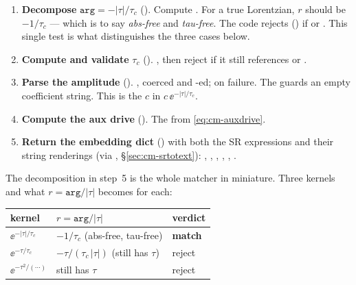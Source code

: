 \begin{enumerate}
  \item \textbf{Decompose} $\mathtt{arg} = -|\tau|/\tau_c$
        (). Compute
        . For a true Lorentzian, $r$
        should be $-1/\tau_c$ --- which is to say \emph{abs-free} and
        \emph{tau-free}. The code rejects () if
         or . This single test is what
        distinguishes the three cases below.

  \item \textbf{Compute and validate} $\tau_c$
        ().
        , then reject if it still
        references  or .

  \item \textbf{Parse the amplitude}
        ().
        , coerced
        and -ed;  on failure. The
         guards an empty coefficient string. This is the $c$ in
        $c\,\ee^{-|\tau|/\tau_c}$.

  \item \textbf{Compute the aux drive}
        (). The
        from \eqref{eq:cm-auxdrive}.

  \item \textbf{Return the embedding dict}
        () with both the SR
        expressions and their string renderings (via ,
        \S\ref{sec:cm-srtotext}): , ,
        , , ,
        .
\end{enumerate}

The decomposition in step~5 is the whole matcher in miniature. Three kernels and
what $r = \mathtt{arg}/|\tau|$ becomes for each:

\begin{center}
\begin{tabular}{@{}lll@{}}
\toprule
kernel & $r = \mathtt{arg}/|\tau|$ & verdict\\
\midrule
$\ee^{-|\tau|/\tau_c}$  & $-1/\tau_c$ (abs-free, tau-free)        & \textbf{match} \\
$\ee^{-\tau/\tau_c}$    & $-\tau/(\tau_c\,|\tau|)$ (still has $\tau$) & reject \\
$\ee^{-\tau^2/(\cdots)}$ & still has $\tau$                       & reject \\
\bottomrule
\end{tabular}
\end{center}

